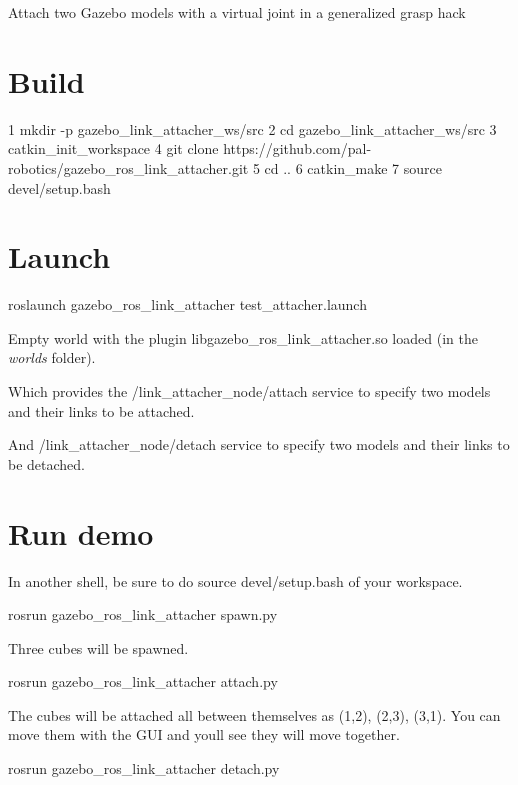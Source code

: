 Attach two Gazebo models with a virtual joint in a generalized grasp hack

\section*{Build}


\begin{DoxyCode}
1 mkdir -p gazebo\_link\_attacher\_ws/src
2 cd gazebo\_link\_attacher\_ws/src
3 catkin\_init\_workspace
4 git clone https://github.com/pal-robotics/gazebo\_ros\_link\_attacher.git
5 cd ..
6 catkin\_make
7 source devel/setup.bash
\end{DoxyCode}


\section*{Launch}

\begin{DoxyVerb}roslaunch gazebo_ros_link_attacher test_attacher.launch
\end{DoxyVerb}


Empty world with the plugin {\ttfamily libgazebo\+\_\+ros\+\_\+link\+\_\+attacher.\+so} loaded (in the {\itshape worlds} folder).

Which provides the {\ttfamily /link\+\_\+attacher\+\_\+node/attach} service to specify two models and their links to be attached.

And {\ttfamily /link\+\_\+attacher\+\_\+node/detach} service to specify two models and their links to be detached.



\section*{Run demo}

In another shell, be sure to do {\ttfamily source devel/setup.\+bash} of your workspace. \begin{DoxyVerb}rosrun gazebo_ros_link_attacher spawn.py
\end{DoxyVerb}


Three cubes will be spawned. \begin{DoxyVerb}rosrun gazebo_ros_link_attacher attach.py
\end{DoxyVerb}


The cubes will be attached all between themselves as (1,2), (2,3), (3,1). You can move them with the G\+UI and you\textquotesingle{}ll see they will move together. \begin{DoxyVerb}rosrun gazebo_ros_link_attacher detach.py
\end{DoxyVerb}


